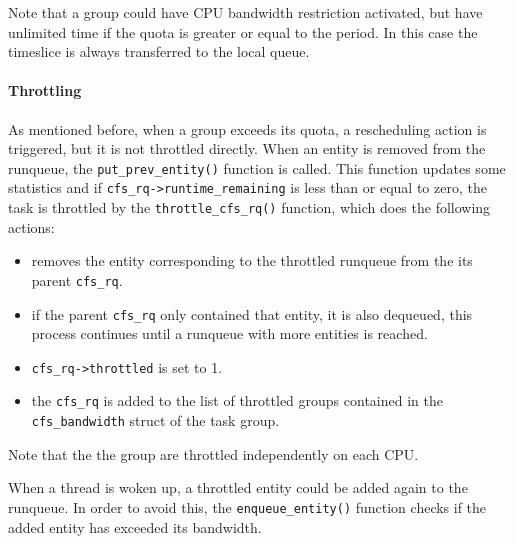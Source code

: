 Note that a group could have CPU bandwidth restriction activated, but have unlimited time if the quota is greater or equal to the period. In this case the timeslice is always transferred to the local queue.

\paragraph{Throttling}%
As mentioned before, when a group exceeds its quota, a rescheduling action is triggered, but it is not throttled directly. When an entity is removed from the runqueue, the \verb|put_prev_entity()| function is called. This function updates some statistics and if \verb|cfs_rq->runtime_remaining| is less than or equal to zero, the task is throttled by the \verb|throttle_cfs_rq()| function, which does the following actions:
\begin{itemize}
    \item removes the entity corresponding to the throttled runqueue from the its parent \verb|cfs_rq|.
    \item if the parent \verb|cfs_rq| only contained that entity, it is also dequeued, this process continues until a runqueue with more entities is reached.
    \item \verb|cfs_rq->throttled| is set to 1.
    \item the \verb|cfs_rq| is added to the list of throttled groups contained in the \verb|cfs_bandwidth| struct of the task group.
\end{itemize}
Note that the the group are throttled independently on each CPU.

When a thread is woken up, a throttled entity could be added again to the runqueue. In order to avoid this, the \verb|enqueue_entity()| function checks if the added entity has exceeded its bandwidth.

